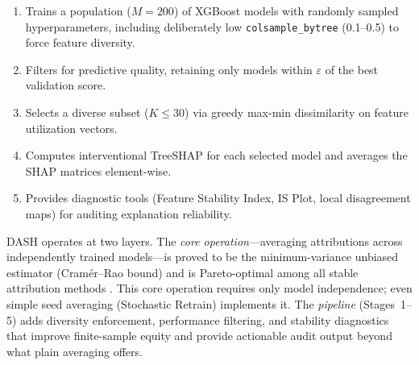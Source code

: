 \documentclass[10pt]{article}
\newcommand{\dash}{\textsc{DASH}}
\begin{document}
\begin{enumerate}
  \item Trains a population ($M = 200$) of XGBoost models with
    randomly sampled hyperparameters, including deliberately low
    \texttt{colsample\_bytree} (0.1--0.5) to force feature diversity.
  \item Filters for predictive quality, retaining only models within
    $\varepsilon$ of the best validation score.
  \item Selects a diverse subset ($K \leq 30$) via greedy max-min
    dissimilarity on feature utilization vectors.
  \item Computes interventional TreeSHAP for each selected model and
    averages the SHAP matrices element-wise.
  \item Provides diagnostic tools (Feature Stability Index, IS Plot,
    local disagreement maps) for auditing explanation reliability.
\end{enumerate}

\noindent \dash{} operates at two layers.
The \emph{core operation}---averaging attributions across independently
trained models---is proved to be the minimum-variance unbiased
estimator (Cram\'er--Rao bound) and is Pareto-optimal among all stable
attribution methods \citep{caraker2026impossibility}.  This core
operation requires only model independence; even simple seed averaging
(Stochastic Retrain) implements it.
The \emph{pipeline} (Stages~1--5) adds diversity enforcement,
performance filtering, and stability diagnostics that improve
finite-sample equity and provide actionable audit output beyond what
plain averaging offers.
\end{document}
